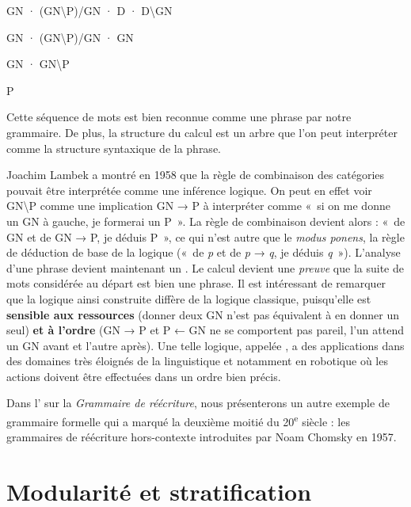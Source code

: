 {
    \z


 \ea


    GN  \textrm{·} (GN{\textbackslash}P)/GN \textrm{·}  D   \textrm{·} D{\textbackslash}GN

    GN  \textrm{·} (GN{\textbackslash}P)/GN  \textrm{·}     GN

    GN \textrm{·}           GN{\textbackslash}P

                        P
\z


    Cette séquence de mots est bien reconnue comme une phrase par notre grammaire. De plus, la structure du calcul est un arbre que l’on peut interpréter comme la structure syntaxique de la phrase.

    Joachim Lambek a montré en 1958 que la règle de combinaison des catégories pouvait être interprétée comme une inférence logique. On peut en effet voir GN{\textbackslash}P comme une implication GN → P à interpréter comme «~si on me donne un GN à gauche, je formerai un P~». La règle de combinaison devient alors : «~de GN et de GN → P, je déduis P~», ce qui n’est autre que le \textit{modus ponens}, la règle de déduction de base de la logique («~de \textit{p} et de \textit{p} → \textit{q}, je déduis \textit{q}~»). L’analyse d’une phrase devient maintenant un . Le calcul devient une \textit{preuve} que la suite de mots considérée au départ est bien une phrase. Il est intéressant de remarquer que la logique ainsi construite diffère de la logique classique, puisqu’elle est \textbf{sensible aux ressources} (donner deux GN n’est pas équivalent à en donner un seul) \textbf{et à l’ordre} (GN → P et P ← GN ne se comportent pas pareil, l’un attend un GN avant et l’autre après). Une telle logique, appelée , a des applications dans des domaines très éloignés de la linguistique et notamment en robotique où les actions doivent être effectuées dans un ordre bien précis.

    Dans l’ sur la \textit{Grammaire de réécriture}, nous présenterons un autre exemple de grammaire formelle qui a marqué la deuxième moitié du 20\textsuperscript{e} siècle : les grammaires de réécriture hors-contexte introduites par Noam Chomsky en 1957.
}
\section{Modularité et stratification}\label{sec:1.3.8}

